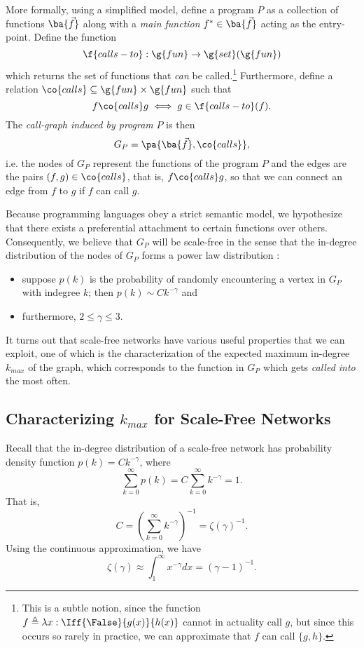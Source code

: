 \documentclass[11pt,a4paper,twocolumn]{article}
\begin{document}
\begin{singlespace}
More formally, using a simplified model, define a program $P$ as a collection
of functions $\ba{\vec{f}}$ along with a \emph{main function}
$f^{\ast}\in\ba{\vec{f}}$ acting as the entry-point. Define the function
\[\f{calls-to}:\g{fun}\to\g{set}(\g{fun})\]
which returns the set of functions that \emph{can} be called.\footnote{This is
a subtle notion, since the function $f\triangleq\lambda x: \Iff{\False}{g(x)}
{h(x)}$ cannot in actuality call $g$, but since this occurs so rarely in
practice, we can approximate that $f$ can call $\{g,h\}$.} Furthermore, define
a relation $\co{calls}\subseteq\g{fun}\times\g{fun}$ such that
\[f\co{calls} g \iff g \in \f{calls-to}(f).\]
The \emph{call-graph induced by program} $P$ is then
\[G_P=\pa{\ba{\vec{f}},\co{calls}},\]
i.e. the nodes of $G_P$ represent the functions of the program $P$ and the
edges are the pairs $(f,g)\in\co{calls}$, that is, $f\co{calls} g$, so that
we can connect an edge from $f$ to $g$ if $f$ can call $g$.

Because programming languages obey a strict semantic model, we hypothesize that
there exists a preferential attachment to certain functions over others.
Consequently, we believe that $G_P$ will be scale-free in the sense that
the in-degree distribution of the nodes of $G_P$ forms a power law
distribution \cite{DUR}:
\begin{itemize}
\item suppose $p(k)$ is the probability of randomly encountering a vertex in $G_P$
with indegree $k$; then $p(k)\sim Ck^{-\gamma}$ and
\item furthermore, $2\leq\gamma\leq 3$.
\end{itemize}

It turns out that scale-free networks have various useful properties that we
can exploit, one of which is the characterization of the expected maximum
in-degree $k_{max}$ of the graph, which corresponds to the function in $G_P$
which gets \emph{called into} the most often.
\subsection{Characterizing $k_{max}$ for Scale-Free Networks}

Recall that the in-degree distribution of a scale-free network has probability
density function $p(k)=Ck^{-\gamma}$, where
\[\sum_{k=0}^{\infty} p(k) = C\sum_{k=0}^{\infty} k^{-\gamma} = 1.\]
That is,
\begin{equation}C=\left(\sum_{k=0}^{\infty} k^{-\gamma}\right)^{-1}
=\zeta(\gamma)^{-1}.\end{equation}
Using the continuous approximation, we have
\begin{equation}\zeta(\gamma)\approx \int_1^{\infty} x^{-\gamma} dx
=(\gamma-1)^{-1}.\end{equation}


\end{singlespace}
\end{document}
